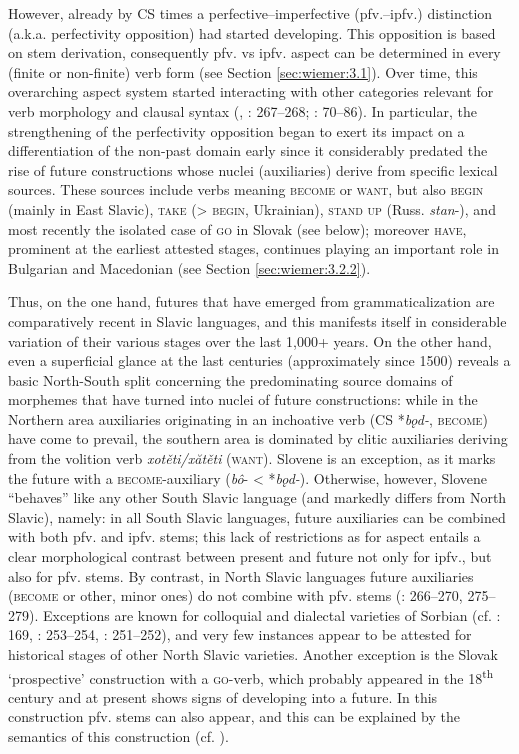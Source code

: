 \documentclass[output=paper,colorlinks,citecolor=brown]{langscibook}
\begin{document}
However, already by CS times a perfective–imperfective (pfv.–ipfv.) distinction (a.k.a. perfectivity opposition) had started developing. This opposition is based on stem derivation, consequently pfv. vs ipfv. aspect can be determined in every (finite or non-finite) verb form (see Section \ref{sec:wiemer:3.1}). Over time, this overarching aspect system started interacting with other categories relevant for verb morphology and clausal syntax (\cite{wiemer_serzant_2017}, \cite{wiemer_2020}: 267--268; \citeyear{wiemer_2022}: 70--86). In particular, the strengthening of the perfectivity opposition began to exert its impact on a differentiation of the non-past domain early since it considerably predated the rise of future constructions whose nuclei (auxiliaries) derive from specific lexical sources. These sources include verbs meaning \textsc{become} or \textsc{want}, but also \textsc{begin} (mainly in East Slavic), \textsc{take} (> \textsc{begin}, Ukrainian), \textsc{stand up} (Russ. \textit{stan}-), and most recently the isolated case of \textsc{go} in Slovak (see below); moreover \textsc{have}, prominent at the earliest attested stages, continues playing an important role in Bulgarian and Macedonian (see Section \ref{sec:wiemer:3.2.2}).

Thus, on the one hand, futures that have emerged from grammaticalization are comparatively recent in Slavic languages, and this manifests itself in considerable variation of their various stages over the last 1,000+ years. On the other hand, even a superficial glance at the last centuries (approximately since 1500) reveals a basic North-South split concerning the predominating source domains of morphemes that have turned into nuclei of future constructions: while in the Northern area auxiliaries originating in an inchoative verb (CS *\textit{bǫd-}, \textsc{become}) have come to prevail, the southern area is dominated by clitic auxiliaries deriving from the volition verb \textit{xotěti/xătěti} (\textsc{want}). Slovene is an exception, as it marks the future with a \textsc{become}-auxiliary (\textit{bô}- < *\textit{bǫd-}). Otherwise, however, Slovene “behaves” like any other South Slavic language (and markedly differs from North Slavic), namely: in all South Slavic languages, future auxiliaries can be combined with both pfv. and ipfv. stems; this lack of restrictions as for aspect entails a clear morphological contrast between present and future not only for ipfv., but also for pfv. stems. By contrast, in North Slavic languages future auxiliaries (\textsc{become} or other, minor ones) do not combine with pfv. stems (\cite{wiemer_2020}: 266--270, 275--279). Exceptions are known for colloquial and dialectal varieties of Sorbian (cf. \cite{Schuster-Šewc1996}: 169, \cite{Scholze2008}: 253--254, \cite{Breu2012}: 251--252), and very few instances appear to be attested for historical stages of other North Slavic varieties. Another exception is the Slovak ‘prospective’ construction with a \textsc{go}-verb, which probably appeared in the 18\textsuperscript{th} century and at present shows signs of developing into a future. In this construction pfv. stems can also appear, and this can be explained by the semantics of this construction (cf. \cite{giger_2008}).
\end{document}
